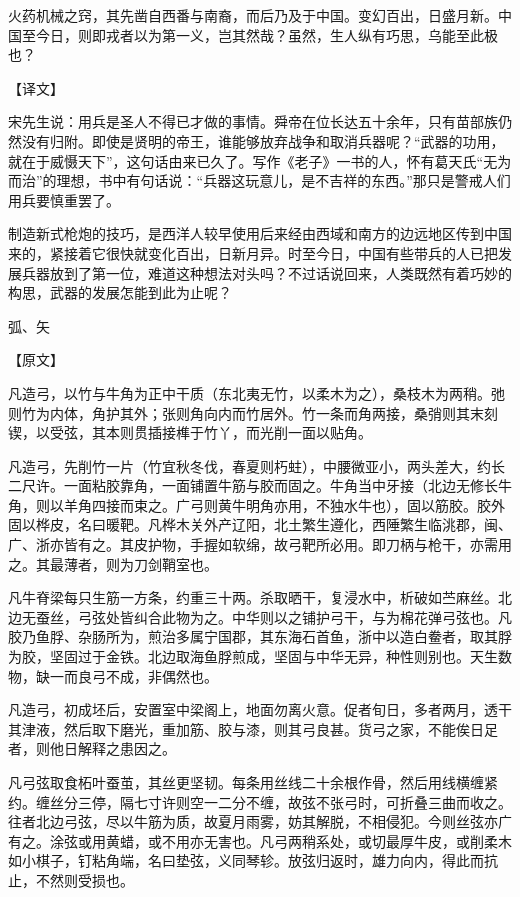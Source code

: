 \documentclass[12pt,UTF8]{ctexbook}
\begin{document}
火药机械之窍，其先凿自西番与南裔，而后乃及于中国。变幻百出，日盛月新。中国至今日，则即戎者以为第一义，岂其然哉？虽然，生人纵有巧思，乌能至此极也？

【译文】

宋先生说：用兵是圣人不得已才做的事情。舜帝在位长达五十余年，只有苗部族仍然没有归附。即使是贤明的帝王，谁能够放弃战争和取消兵器呢？“武器的功用，就在于威慑天下”，这句话由来已久了。写作《老子》一书的人，怀有葛天氏“无为而治”的理想，书中有句话说：“兵器这玩意儿，是不吉祥的东西。”那只是警戒人们用兵要慎重罢了。

制造新式枪炮的技巧，是西洋人较早使用后来经由西域和南方的边远地区传到中国来的，紧接着它很快就变化百出，日新月异。时至今日，中国有些带兵的人已把发展兵器放到了第一位，难道这种想法对头吗？不过话说回来，人类既然有着巧妙的构思，武器的发展怎能到此为止呢？

弧、矢

【原文】

凡造弓，以竹与牛角为正中干质（东北夷无竹，以柔木为之），桑枝木为两稍。弛则竹为内体，角护其外；张则角向内而竹居外。竹一条而角两接，桑弰则其末刻锲，以受弦，其本则贯插接榫于竹丫，而光削一面以贴角。

凡造弓，先削竹一片（竹宜秋冬伐，春夏则朽蛀），中腰微亚小，两头差大，约长二尺许。一面粘胶靠角，一面铺置牛筋与胶而固之。牛角当中牙接（北边无修长牛角，则以羊角四接而束之。广弓则黄牛明角亦用，不独水牛也），固以筋胶。胶外固以桦皮，名曰暖靶。凡桦木关外产辽阳，北土繁生遵化，西陲繁生临洮郡，闽、广、浙亦皆有之。其皮护物，手握如软绵，故弓靶所必用。即刀柄与枪干，亦需用之。其最薄者，则为刀剑鞘室也。

凡牛脊梁每只生筋一方条，约重三十两。杀取晒干，复浸水中，析破如苎麻丝。北边无蚕丝，弓弦处皆纠合此物为之。中华则以之铺护弓干，与为棉花弹弓弦也。凡胶乃鱼脬、杂肠所为，煎治多属宁国郡，其东海石首鱼，浙中以造白鲞者，取其脬为胶，坚固过于金铁。北边取海鱼脬煎成，坚固与中华无异，种性则别也。天生数物，缺一而良弓不成，非偶然也。

凡造弓，初成坯后，安置室中梁阁上，地面勿离火意。促者旬日，多者两月，透干其津液，然后取下磨光，重加筋、胶与漆，则其弓良甚。货弓之家，不能俟日足者，则他日解释之患因之。

凡弓弦取食柘叶蚕茧，其丝更坚韧。每条用丝线二十余根作骨，然后用线横缠紧约。缠丝分三停，隔七寸许则空一二分不缠，故弦不张弓时，可折叠三曲而收之。往者北边弓弦，尽以牛筋为质，故夏月雨雾，妨其解脱，不相侵犯。今则丝弦亦广有之。涂弦或用黄蜡，或不用亦无害也。凡弓两稍系处，或切最厚牛皮，或削柔木如小棋子，钉粘角端，名曰垫弦，义同琴轸。放弦归返时，雄力向内，得此而抗止，不然则受损也。
\end{document}
